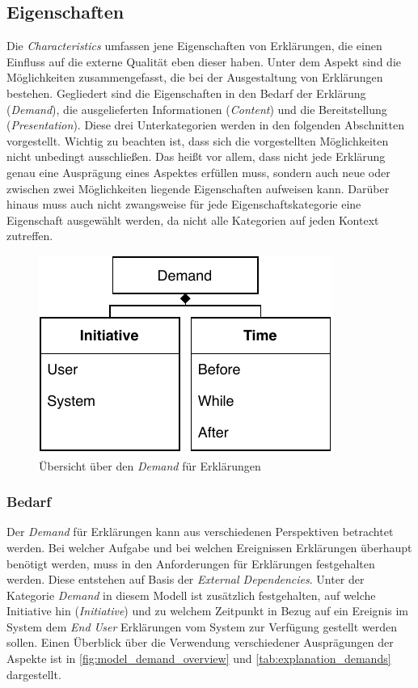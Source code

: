 \subsection{Eigenschaften}

Die \textit{Characteristics} umfassen jene Eigenschaften von Erklärungen, die einen Einfluss auf die externe Qualität eben dieser haben. Unter dem Aspekt sind die Möglichkeiten zusammengefasst, die bei der Ausgestaltung von Erklärungen bestehen. Gegliedert sind die Eigenschaften in den Bedarf der Erklärung (\textit{Demand}), die ausgelieferten Informationen (\textit{Content}) und die Bereitstellung (\textit{Presentation}). Diese drei Unterkategorien werden in den folgenden Abschnitten vorgestellt. Wichtig zu beachten ist, dass sich die vorgestellten Möglichkeiten nicht unbedingt ausschließen. Das heißt vor allem, dass nicht jede Erklärung genau eine Ausprägung eines Aspektes erfüllen muss, sondern auch neue oder zwischen zwei Möglichkeiten liegende Eigenschaften aufweisen kann. Darüber hinaus muss auch nicht zwangsweise für jede Eigenschaftskategorie eine Eigenschaft ausgewählt werden, da nicht alle Kategorien auf jeden Kontext zutreffen.

\begin{figure}[htb!]
    \begin{center}
        \includegraphics{contents/05_model_description/res/model_demand_overview.pdf}
    \end{center}
    \caption{Übersicht über den \textit{Demand} für Erklärungen}
    \label{fig:model_demand_overview}
\end{figure}

\subsubsection{Bedarf}

Der \textit{Demand}  für Erklärungen kann aus verschiedenen Perspektiven betrachtet werden. Bei welcher Aufgabe und bei welchen Ereignissen Erklärungen überhaupt benötigt werden, muss in den Anforderungen für Erklärungen festgehalten werden. Diese entstehen auf Basis der \textit{External Dependencies}. Unter der Kategorie \textit{Demand} in diesem Modell ist zusätzlich festgehalten, auf welche Initiative hin (\textit{Initiative}) und zu welchem Zeitpunkt in Bezug auf ein Ereignis im System dem \textit{End User} Erklärungen vom System zur Verfügung gestellt werden sollen. Einen Überblick über die Verwendung verschiedener Ausprägungen der Aspekte ist in \autoref{fig:model_demand_overview} und \autoref{tab:explanation_demands} dargestellt.

